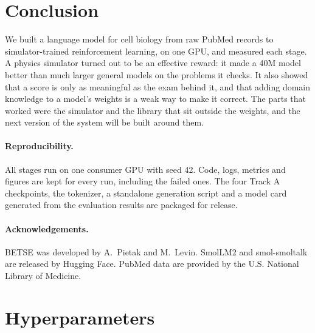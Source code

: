 \documentclass[11pt]{article}
\begin{document}
\section{Conclusion}

We built a language model for cell biology from raw PubMed records to
simulator-trained reinforcement learning, on one GPU, and measured each
stage. A physics simulator turned out to be an effective reward: it made a
40M model better than much larger general models on the problems it
checks. It also showed that a score is only as meaningful as the exam behind it,
and that adding domain knowledge to a model's weights is a weak way to
make it correct. The parts that worked were the simulator and the library
that sit outside the weights, and the next version of the system will be
built around them.

\paragraph{Reproducibility.} All stages run on one consumer GPU with seed
42. Code, logs, metrics and figures are kept for every run, including the
failed ones. The four Track A checkpoints, the tokenizer, a standalone
generation script and a model card generated from the evaluation results
are packaged for release.

\paragraph{Acknowledgements.} BETSE was developed by A.~Pietak and
M.~Levin. SmolLM2 and smol-smoltalk are released by Hugging Face. PubMed
data are provided by the U.S. National Library of Medicine.




\appendix
\section{Hyperparameters}
\end{document}
